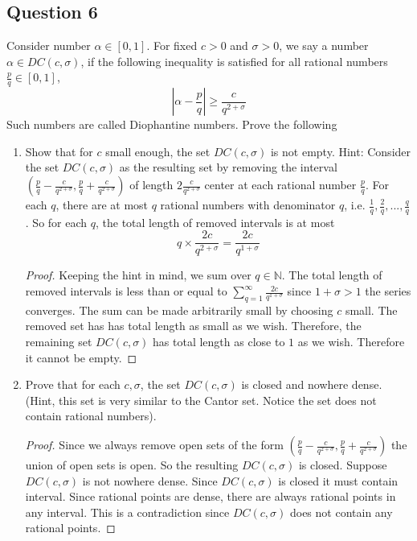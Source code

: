 \documentclass{tufte-book}
\theoremstyle{mytheoremstyle}
\theoremstyle{mylemstyle}
\theoremstyle{mydefstyle}
\begin{document}
\subsection{Question 6}
Consider number $\alpha \in [0,1]$. For fixed $c>0$ and $\sigma>0$, we say a number $\alpha \in DC(c,\sigma)$, if the following inequality is satisfied for all rational numbers $\frac{p}{q} \in [0,1]$,
\[\left| \alpha-\frac{p}{q}\right| \geq \frac{c}{q^{2+\sigma}}\]
Such numbers are called Diophantine numbers.  Prove the following

\begin{enumerate}
\item Show that for $c$ small enough, the set $DC(c,\sigma)$ is not empty.
Hint: Consider the set $DC(c,\sigma)$ as the resulting set by removing the interval $(\frac{p}{q} - \frac{c}{q^{2+\sigma}}, \frac{p}{q} + \frac{c}{q^{2+\sigma}})$ of length $2\frac{c}{q^{2+\sigma}}$ center at each rational number $\frac{p}{q}$.  For each $q$, there are at most $q$ rational numbers with denominator $q$, i.e. $\frac{1}{q}, \frac{2}{q},...,\frac{q}{q}$.  So for each $q$, the total length of removed intervals is at most
\[ q \times \frac{2c}{q^{2+\sigma}} = \frac{2c}{q^{1+\sigma}} \] 
\begin{proof}
Keeping the hint in mind, we sum over $q \in \mathbb{N}$.  The total length of removed intervals is less than or equal to $\sum_{q=1}^{\infty}\frac{2c}{q^{1+\sigma}}$ since $1 + \sigma >1$ the series converges.  The sum can be made arbitrarily small by choosing $c$ small.  The removed set has has total length as small as we wish.  Therefore, the remaining set $DC(c,\sigma)$ has total length as close to $1$ as we wish.  Therefore it cannot be empty.
\end{proof}

\item Prove that for each $c,\sigma$, the set $DC(c,\sigma)$ is closed and nowhere dense. (Hint, this set is very similar to the Cantor set.  Notice the set does not contain rational numbers).

\begin{proof}

Since we always remove open sets of the form $(\frac{p}{q} - \frac{c}{q^{2+\sigma}}, \frac{p}{q} + \frac{c}{q^{2+\sigma}})$ the union of open sets is open.  So the resulting $DC(c,\sigma)$ is closed. Suppose $DC(c,\sigma)$ is not nowhere dense.  Since $DC(c, \sigma)$ is closed it must contain interval.  Since rational points are dense, there are always rational points in any interval.  This is a contradiction since $DC(c, \sigma)$ does not contain any rational points.
\end{proof}

\end{enumerate}
\end{document}
